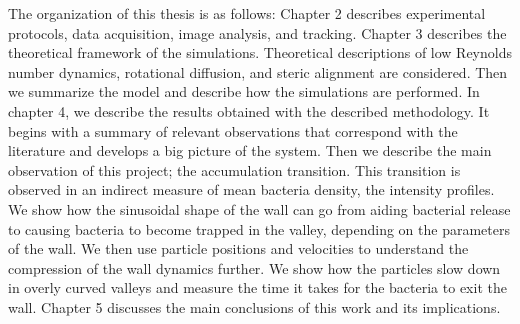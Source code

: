 The organization of this thesis is as follows: Chapter 2 describes experimental protocols, data acquisition, image analysis, and tracking. Chapter 3 describes the theoretical framework of the simulations. Theoretical descriptions of low Reynolds number dynamics, rotational diffusion, and steric alignment are considered. Then we summarize the model and describe how the simulations are performed. In chapter 4, we describe the results obtained with the described methodology. It begins with a summary of relevant observations that correspond with the literature and develops a big picture of the system. Then we describe the main observation of this project; the accumulation transition. This transition is observed in an indirect measure of mean bacteria density, the intensity profiles. We show how the sinusoidal shape of the wall can go from aiding bacterial release to causing bacteria to become trapped in the valley, depending on the parameters of the wall. We then use particle positions and velocities to understand the compression of the wall dynamics further. We show how the particles slow down in overly curved valleys and measure the time it takes for the bacteria to exit the wall. Chapter 5 discusses the main conclusions of this work and its implications.


